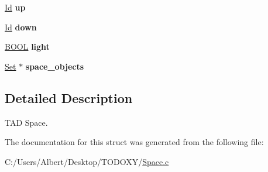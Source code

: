 \begin{DoxyCompactItemize}
\item 
\hypertarget{struct___space_af2a50145d93dfb8d82b8b42138dc57a1}{\hyperlink{_types_8h_a845e604fb28f7e3d97549da3448149d3}{Id} {\bfseries up}}\label{struct___space_af2a50145d93dfb8d82b8b42138dc57a1}

\item 
\hypertarget{struct___space_ac20194f418676bb03cca7e0fdcb6f559}{\hyperlink{_types_8h_a845e604fb28f7e3d97549da3448149d3}{Id} {\bfseries down}}\label{struct___space_ac20194f418676bb03cca7e0fdcb6f559}

\item 
\hypertarget{struct___space_a15f20d8ccdec846b9a4f77464748bff5}{\hyperlink{_types_8h_a3e5b8192e7d9ffaf3542f1210aec18dd}{B\-O\-O\-L} {\bfseries light}}\label{struct___space_a15f20d8ccdec846b9a4f77464748bff5}

\item 
\hypertarget{struct___space_a08b526f6f3dfeda7068eaa86a7f9a335}{\hyperlink{_set_8h_a6d3b7f7c92cbb4577ef3ef7ddbf93161}{Set} $\ast$ {\bfseries space\-\_\-objects}}\label{struct___space_a08b526f6f3dfeda7068eaa86a7f9a335}

\end{DoxyCompactItemize}


\subsection{Detailed Description}
T\-A\-D Space. 


\begin{DoxyItemize}
\item 
\end{DoxyItemize}

The documentation for this struct was generated from the following file\-:\begin{DoxyCompactItemize}
\item 
C\-:/\-Users/\-Albert/\-Desktop/\-T\-O\-D\-O\-X\-Y/\hyperlink{_space_8c}{Space.\-c}\end{DoxyCompactItemize}
